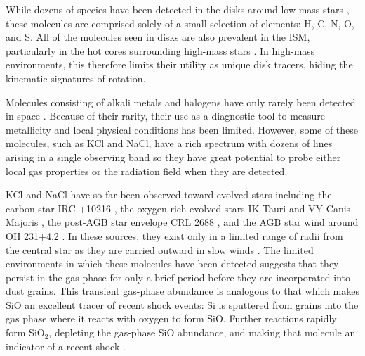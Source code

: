 \documentclass[twocolumn]{aastex62}
\begin{document}
While dozens of species have been detected in the disks around low-mass stars
\citep{McGuire2018c}, these molecules are comprised solely of a small selection
of elements: H, C, N, O, and S.  All of the molecules seen in disks are also
prevalent in the ISM, particularly in the hot cores surrounding high-mass stars
\citep{Nummelin1998a,Belloche2013a}. In high-mass environments, this therefore
limits their utility as unique disk tracers, hiding the kinematic signatures of
rotation.



Molecules consisting of alkali metals and halogens have only rarely
been detected in space \citep{McGuire2018c}.  Because of their rarity, their
use as a diagnostic tool to measure metallicity and local physical conditions
has been limited.  However, some of these molecules, such as KCl and NaCl, have
a rich spectrum with dozens of lines arising in a single observing band
so they have great potential to probe either local gas
properties or the radiation field when they are detected.


KCl and NaCl have so far been observed toward evolved stars including the
carbon star IRC +10216 \citep{Cernicharo1987a}, the oxygen-rich evolved stars IK
Tauri and VY Canis
Majoris \citep{Milam2007a}, the post-AGB star envelope CRL 2688
\citep{Highberger2003a}, and the AGB star wind around OH 231+4.2
\citep{Sanchez-Contreras2018a}.  In these sources, they exist only in a limited
range of radii from the central star as they are
carried outward
in slow winds \citep{Herwig2005a}.  The limited environments in which these
molecules have been detected suggests that they persist in the gas phase
for only a brief period 
before they are incorporated into dust grains.
This transient gas-phase abundance is analogous to that which makes SiO an
excellent tracer of recent shock events: Si is sputtered from grains into the
gas phase where it reacts with oxygen to form SiO.  Further reactions rapidly
form SiO$_2$, depleting the gas-phase SiO abundance, and making that molecule
an indicator of a recent shock \citep{Schilke1997a}. 
\end{document}
